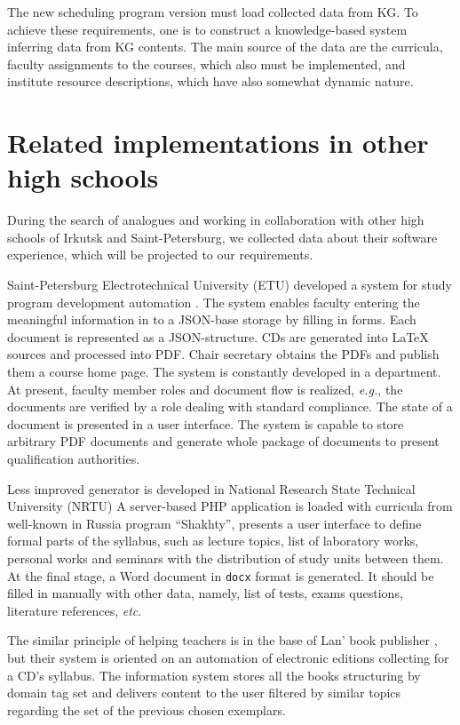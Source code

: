 \documentclass[
]{aiitart}
\begin{document}

The new scheduling program version must load collected data from KG.  To achieve these requirements, one is to construct a knowledge-based system inferring data from KG contents.  The main source of the data are the curricula, faculty assignments to the courses, which also must be implemented, and institute resource descriptions, which have also somewhat dynamic nature.

\section{Related implementations in other high schools}

During the search of analogues and working in collaboration with other high schools of Irkutsk and Saint-Petersburg, we collected data about their software experience, which will be projected to our requirements.

Saint-Petersburg Electrotechnical University (ETU) developed a system for study program development automation \cite{leti}. %
The system enables faculty entering the meaningful information in to a JSON-base storage by filling in forms.  Each document is represented as a JSON-structure.  CDs are generated into \LaTeX{} sources and processed into PDF.  Chair secretary obtains the PDFs and publish them a course home page.  The system is constantly developed in a department.  At present, faculty member roles and document flow is realized, \emph{e.g.}, the documents are verified by a role dealing with standard compliance.  The state of a document is presented in a user interface.  The system is capable to store arbitrary PDF documents and generate whole package of documents to present qualification authorities.

Less improved generator is developed in National Research State Technical University (NRTU) \cite{nrtu} %
A server-based PHP application is loaded with curricula from well-known in Russia program ``Shakhty'', presents a user interface to define formal parts of the syllabus, such as lecture topics, list of laboratory works, personal works and seminars with the distribution of study units between them.  At the final stage, a Word document in \verb|docx| format is generated.  It should be filled in manually with other data, namely, list of tests, exams questions, literature references, \emph{etc}.

The similar principle of helping teachers is in the base of Lan' book publisher \cite{lanbook}, but their system is oriented on an automation of electronic editions collecting for a CD's syllabus.  The information system stores all the books structuring by domain tag set and delivers content to the user filtered by similar topics regarding the set of the previous chosen exemplars.
\end{document}
